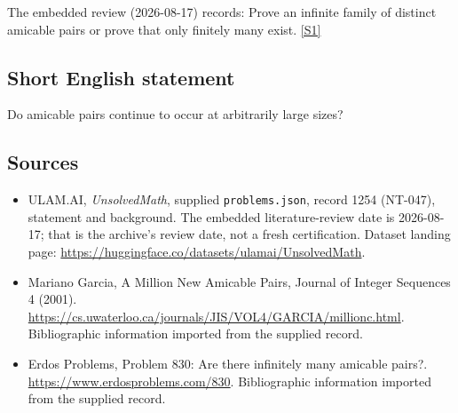 \documentclass[11pt,a4paper]{article}
\newcommand{\sref}[2]{\hyperlink{source:#1:#2}{[S#2]}}
\begin{document}
The embedded review (2026-08-17) records: Prove an infinite family of distinct amicable pairs or prove that only finitely many exist. \sref{1254}{1}

\subsection{Short English statement}

Do amicable pairs continue to occur at arbitrarily large sizes?

\subsection{Sources}

{\small

\begin{itemize}

\item[\hypertarget{source:1254:1}{S1}] ULAM.AI, \emph{UnsolvedMath}, supplied \texttt{problems.json}, record 1254 (NT-047), statement and background. The embedded literature-review date is 2026-08-17; that is the archive’s review date, not a fresh certification. Dataset landing page: \url{https://huggingface.co/datasets/ulamai/UnsolvedMath}.

\item[\hypertarget{source:1254:2}{S2}] Mariano Garcia, A Million New Amicable Pairs, Journal of Integer Sequences 4 (2001). \url{https://cs.uwaterloo.ca/journals/JIS/VOL4/GARCIA/millionc.html}. Bibliographic information imported from the supplied record.

\item[\hypertarget{source:1254:3}{S3}] Erdos Problems, Problem 830: Are there infinitely many amicable pairs?. \url{https://www.erdosproblems.com/830}. Bibliographic information imported from the supplied record.

\end{itemize}

}

\label{end:1254}
\end{document}

